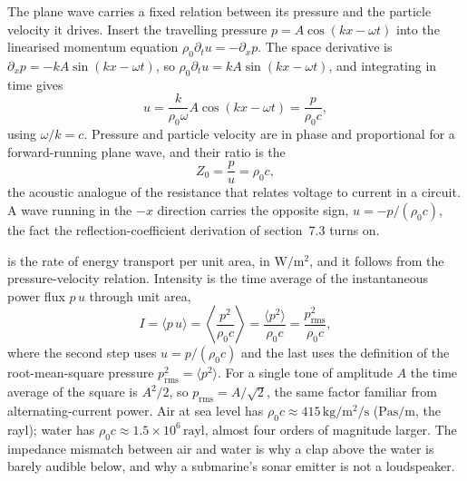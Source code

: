 The plane wave carries a fixed relation between its pressure and the
particle velocity it drives. Insert the travelling pressure $p =
A\cos(kx-\omega t)$ into the linearised momentum equation $\rho_0
\partial_t u = -\partial_x p$. The space derivative is
$\partial_x p = -kA\sin(kx-\omega t)$, so $\rho_0 \partial_t u =
kA\sin(kx-\omega t)$, and integrating in time gives
\[
u = \frac{k}{\rho_0 \omega}A\cos(kx-\omega t) = \frac{p}{\rho_0 c},
\]
using $\omega/k = c$. Pressure and particle velocity are in phase and
proportional for a forward-running plane wave, and their ratio is the
\[
Z_0 = \frac{p}{u} = \rho_0 c,
\]
the acoustic analogue of the resistance that relates voltage to current
in a circuit. A wave running in the $-x$ direction carries the opposite
sign, $u = -p/(\rho_0 c)$, the fact the reflection-coefficient
derivation of section~7.3 turns on.

 is the rate of energy transport per unit
area, in $\si{\watt\per\meter\squared}$, and it follows from the
pressure-velocity relation. Intensity is the time average of the
instantaneous power flux $p\,u$ through unit area,
\[
I = \langle p\,u\rangle
  = \left\langle \frac{p^2}{\rho_0 c}\right\rangle
  = \frac{\langle p^2\rangle}{\rho_0 c}
  = \frac{p_{\text{rms}}^2}{\rho_0 c},
\]
where the second step uses $u = p/(\rho_0 c)$ and the last uses the
definition of the root-mean-square pressure
$p_{\text{rms}}^2 = \langle p^2\rangle$. For a single tone of amplitude
$A$ the time average of the square is $A^2/2$, so $p_{\text{rms}} =
A/\sqrt 2$, the same factor familiar from alternating-current power. Air
at sea level has $\rho_0 c \approx 415\,\si{\kilogram\per\meter\squared
\per\second}$ ($\si{\pascal\second\per\meter}$, the rayl); water has
$\rho_0 c \approx 1.5 \times 10^{6}\,\text{rayl}$, almost four orders
of magnitude larger. The impedance mismatch between air and water is
why a clap above the water is barely audible below, and why a
submarine's sonar emitter is not a loudspeaker.

